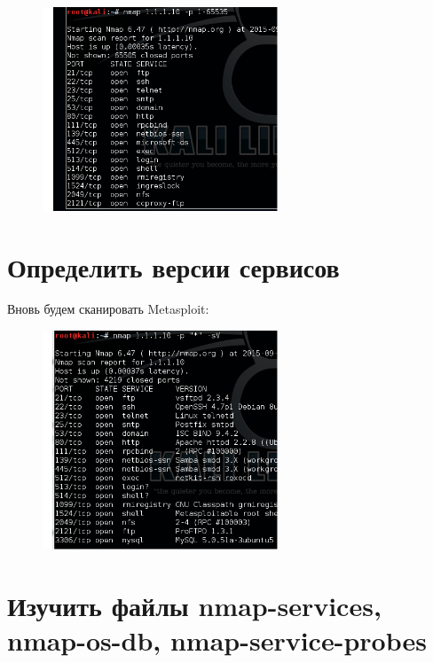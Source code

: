 \documentclass[utf8x, 12pt]{G7-32}
\begin{document}
\begin{figure}[hhh!]
	\begin{center}
		
		\includegraphics[width=7cm]{img2/23}
	\end{center}
\end{figure}



\newpage
\section{Определить версии сервисов}

Вновь будем сканировать Metasploit:

\begin{figure}[hhh!]
	\begin{center}
		
		\includegraphics[width=7cm]{img2/24}
	\end{center}
\end{figure}

\newpage
\section{Изучить файлы nmap-services, nmap-os-db, nmap-service-probes}
\end{document}
